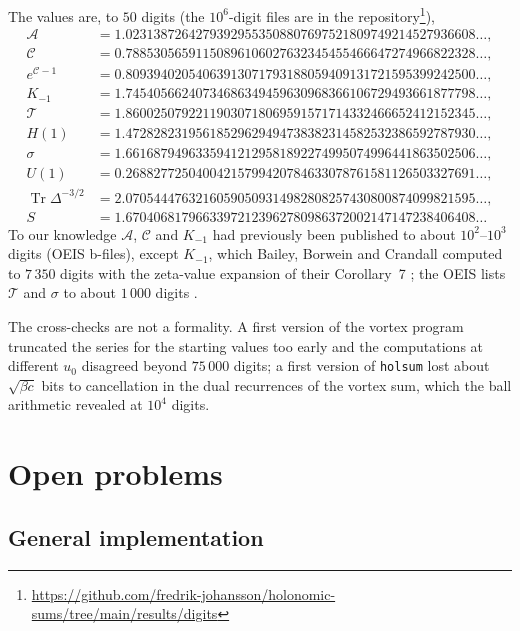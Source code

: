 \documentclass[11pt,reqno]{amsart}
\theoremstyle{definition}
\theoremstyle{remark}
\begin{document}
The values are, to $50$ digits (the $10^6$-digit files are in the repository\footnote{\url{https://github.com/fredrik-johansson/holonomic-sums/tree/main/results/digits}}),
\begin{align*}
  \mathcal A &= 1.02313872642793929553508807697521809749214527936608\ldots, \\
  \mathcal C &= 0.78853056591150896106027632345455466647274966822328\ldots, \\
  e^{\mathcal C-1} &= 0.80939402054063913071793188059409131721595399242500\ldots, \\
  K_{-1} &= 1.74540566240734686349459630968366106729493661877798\ldots, \\
  \mathcal T &= 1.86002507922119030718069591571714332466652412152345\ldots, \\
  H(1) &= 1.47282823195618529629494738382314582532386592787930\ldots, \\
  \sigma &= 1.66168794963359412129581892274995074996441863502506\ldots, \\
  U(1) &= 0.26882772504004215799420784633078761581126503327691\ldots, \\
  \operatorname{Tr}\Delta^{-3/2} &= 2.07054447632160590509314982808257430800874099821595\ldots, \\
  S &= 1.67040681796633972123962780986372002147147238406408\ldots
\end{align*}
To our knowledge $\mathcal A$, $\mathcal C$ and $K_{-1}$ had previously been published to about $10^2$--$10^3$ digits
(OEIS b-files), except $K_{-1}$, which Bailey, Borwein and Crandall computed to $7\,350$ digits with the zeta-value
expansion of their Corollary~7 \cite{BBC97}; the OEIS lists $\mathcal T$ and $\sigma$ to about $1\,000$ digits
\cite[A226317, A112302]{OEIS}.

The cross-checks are not a formality. A first version of the vortex program truncated the series for the starting
values too early and the computations at different $u_0$ disagreed
beyond $75\,000$ digits; a first version of \texttt{holsum} lost about $\sqrt{\beta c}$ bits to cancellation in the
dual recurrences of the vortex sum, which the ball arithmetic revealed at $10^4$ digits.

\section{Open problems}\label{sec:open}

\subsection{General implementation}
\end{document}
